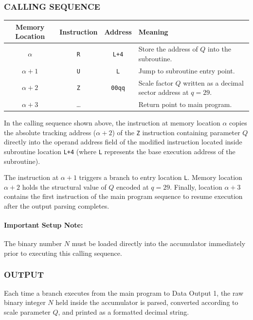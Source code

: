 \subsubsection*{CALLING SEQUENCE}
\begin{table}[h!]
\centering
\begin{tabularx}{\textwidth}{cccX}
\toprule
\textbf{Memory Location} & \textbf{Instruction} & \textbf{Address} & \textbf{Meaning} \\
\midrule
$\alpha$               & \texttt{R}      & \texttt{L+4}     & Store the address of $Q$ into the subroutine. \\
$\alpha+1$             & \texttt{U}      & \texttt{L}       & Jump to subroutine entry point. \\
$\alpha+2$             & \texttt{Z}      & \texttt{00qq}    & Scale factor $Q$ written as a decimal sector address at $q=29$. \\
$\alpha+3$             & \dots           &                  & Return point to main program. \\
\bottomrule
\end{tabularx}
\end{table}

In the calling sequence shown above, the instruction at memory location $\alpha$ copies the absolute tracking address ($\alpha+2$) of the \texttt{Z} instruction containing parameter $Q$ directly into the operand address field of the modified instruction located inside subroutine location \texttt{L+4} (where \texttt{L} represents the base execution address of the subroutine). 

The instruction at $\alpha+1$ triggers a branch to entry location \texttt{L}. Memory location $\alpha+2$ holds the structural value of $Q$ encoded at $q=29$. Finally, location $\alpha+3$ contains the first instruction of the main program sequence to resume execution after the output parsing completes.

\paragraph{Important Setup Note:}
The binary number $N$ must be loaded directly into the accumulator immediately prior to executing this calling sequence.

\subsubsection*{OUTPUT}
Each time a branch executes from the main program to Data Output 1, the raw binary integer $N$ held inside the accumulator is parsed, converted according to scale parameter $Q$, and printed as a formatted decimal string. 

